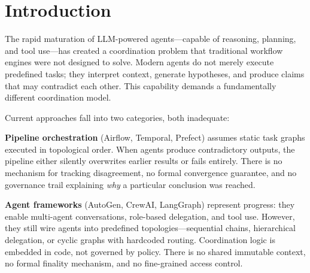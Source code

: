 \documentclass[11pt]{article}
\begin{document}
\begin{abstract}
Validation on two scenarios---M\&A due diligence (Project Horizon) and multi-period financial consolidation with bitemporal restatement---demonstrates that $V(t)$ reaches 0.0000 at resolution epochs (the first empirical confirmation of full intra-epoch convergence), exhibits a sawtooth trajectory across evidence epochs as predicted by the perpetual lifecycle model, and produces domain-independent dynamics confirmed across both scenarios. Five-gate prevention of false finality is ablation-confirmed, and governance modes produce distinct coverage--autonomy positions. The architecture is validated by 141 Rust and 319 TypeScript tests.

Crucially, finality is not terminal: new evidence, regulatory amendments, or periodic review triggers re-open convergence over the same graph, producing a chain of certified checkpoints that models the perpetual lifecycle of regulated knowledge. The resulting architecture is designed for regulated environments where temporal auditability, policy traceability, ongoing monitoring, and cryptographic proof of every decision point are operational requirements.
\end{abstract}

\section{Introduction}

The rapid maturation of LLM-powered agents---capable of reasoning, planning, and tool use---has created a coordination problem that traditional workflow engines were not designed to solve. Modern agents do not merely execute predefined tasks; they interpret context, generate hypotheses, and produce claims that may contradict each other. This capability demands a fundamentally different coordination model.

Current approaches fall into two categories, both inadequate:

\textbf{Pipeline orchestration} (Airflow, Temporal, Prefect) assumes static task graphs executed in topological order. When agents produce contradictory outputs, the pipeline either silently overwrites earlier results or fails entirely. There is no mechanism for tracking disagreement, no formal convergence guarantee, and no governance trail explaining \emph{why} a particular conclusion was reached.

\textbf{Agent frameworks} (AutoGen, CrewAI, LangGraph) represent progress: they enable multi-agent conversations, role-based delegation, and tool use. However, they still wire agents into predefined topologies---sequential chains, hierarchical delegation, or cyclic graphs with hardcoded routing. Coordination logic is embedded in code, not governed by policy. There is no shared immutable context, no formal finality mechanism, and no fine-grained access control.
\end{document}
